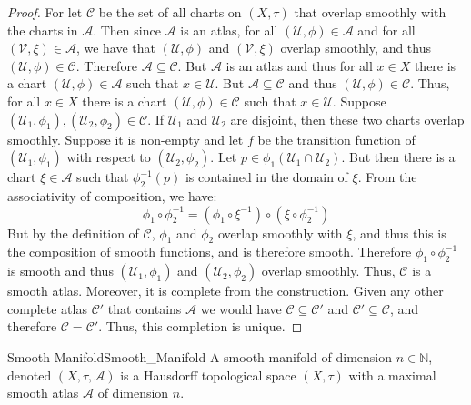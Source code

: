     \begin{proof}
        For let $\mathcal{C}$ be the set of all charts on $(X,\tau)$ that
        overlap smoothly with the charts in $\mathcal{A}$. Then since
        $\mathcal{A}$ is an atlas, for all
        $(\mathcal{U},\phi)\in\mathcal{A}$ and for all
        $(\mathcal{V},\xi)\in\mathcal{A}$, we have that $(\mathcal{U},\phi)$
        and $(\mathcal{V},\xi)$ overlap smoothly, and thus
        $(\mathcal{U},\phi)\in\mathcal{C}$. Therefore
        $\mathcal{A}\subseteq\mathcal{C}$. But $\mathcal{A}$ is an
        atlas and thus for all $x\in{X}$ there is a chart
        $(\mathcal{U},\phi)\in\mathcal{A}$ such that $x\in\mathcal{U}$.
        But $\mathcal{A}\subseteq\mathcal{C}$ and thus
        $(\mathcal{U},\phi)\in\mathcal{C}$. Thus, for all $x\in{X}$ there
        is a chart $(\mathcal{U},\phi)\in\mathcal{C}$ such that
        $x\in\mathcal{U}$. Suppose
        $(\mathcal{U}_{1},\phi_{1}),%
         (\mathcal{U}_{2},\phi_{2})\in\mathcal{C}$.
        If $\mathcal{U}_{1}$ and $\mathcal{U}_{2}$ are disjoint, then
        these two charts overlap smoothly. Suppose it is non-empty and let
        $f$ be the transition function of $(\mathcal{U}_{1},\phi_{1})$ with
        respect to $(\mathcal{U}_{2},\phi_{2})$. Let
        $p\in\phi_{1}(\mathcal{U}_{1}\cap\mathcal{U}_{2})$. But then there
        is a chart $\xi\in\mathcal{A}$ such that $\phi_{2}^{\minus{1}}(p)$
        is contained in the domain of $\xi$. From the associativity of
        composition, we have:
        \begin{equation}
            \phi_{1}\circ\phi_{2}^{\minus{1}}
            =(\phi_{1}\circ\xi^{\minus{1}})\circ
             (\xi\circ\phi_{2}^{\minus{1}})
        \end{equation}
        But by the definition of $\mathcal{C}$, $\phi_{1}$ and $\phi_{2}$
        overlap smoothly with $\xi$, and thus this is the composition of
        smooth functions, and is therefore smooth. Therefore
        $\phi_{1}\circ\phi_{2}^{\minus{1}}$ is smooth and thus
        $(\mathcal{U}_{1},\phi_{1})$ and $(\mathcal{U}_{2},\phi_{2})$
        overlap smoothly. Thus, $\mathcal{C}$ is a smooth atlas. Moreover,
        it is complete from the construction. Given any other complete
        atlas $\mathcal{C}'$ that contains $\mathcal{A}$ we would have
        $\mathcal{C}\subseteq\mathcal{C}'$ and
        $\mathcal{C}'\subseteq\mathcal{C}$, and therefore
        $\mathcal{C}=\mathcal{C}'$. Thus, this completion is unique.
    \end{proof}
    \begin{fdefinition}{Smooth Manifold}{Smooth_Manifold}
        A smooth manifold of dimension $n\in\mathbb{N}$, denoted
        $(X,\tau,\mathcal{A})$ is a Hausdorff topological space
        $(X,\tau)$ with a maximal smooth atlas $\mathcal{A}$ of
        dimension $n$.
    \end{fdefinition}
